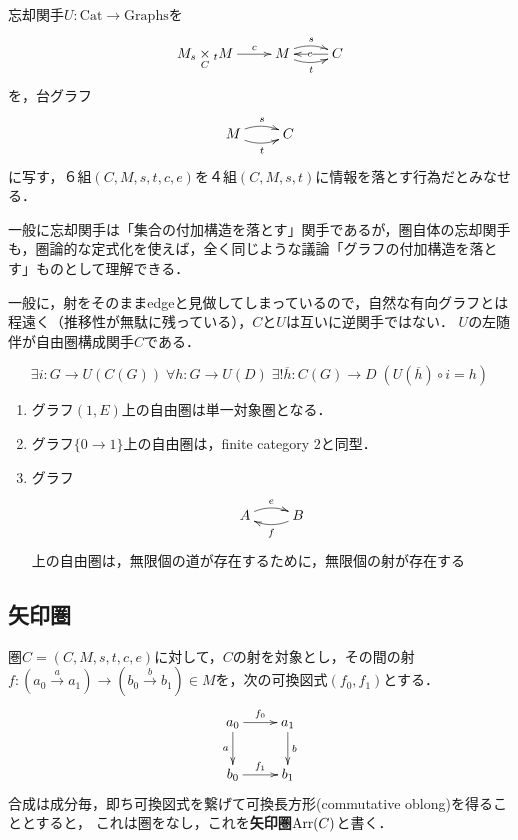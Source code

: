 \documentclass[uplatex, dvipdfmx]{jsreport}
\begin{document}
\begin{definition}
    忘却関手$U:\mathrm{Cat}\to \mathrm{Graphs}$を
    \[\xymatrix{
        {M_s\underset{C}{\times}{}_tM}\ar[r]^-c&M\ar@/^/[r]^-{s}\ar@/_/[r]_-{t}&C\ar[l]|e
    }\]
    を，台グラフ
    \[\xymatrix{
        M\ar@/^/[r]^-{s}\ar@/_/[r]_-{t}&C
    }\]
    に写す，６組$(C,M,s,t,c,e)$を４組$(C,M,s,t)$に情報を落とす行為だとみなせる．
\end{definition}
\begin{remark}
    一般に忘却関手は「集合の付加構造を落とす」関手であるが，圏自体の忘却関手も，圏論的な定式化を使えば，全く同じような議論「グラフの付加構造を落とす」ものとして理解できる．

    一般に，射をそのままedgeと見做してしまっているので，自然な有向グラフとは程遠く（推移性が無駄に残っている），$C$と$U$は互いに逆関手ではない．
    $U$の左随伴が自由圏構成関手$C$である．
\end{remark}

\begin{definition}
    \[ \exists i:G\to U(C(G))\; \forall h:G\to U(D) \; \exists !\overline{h}:C(G)\to D\; (U(\overline{h})\circ i=h) \]
\end{definition}
\begin{example}\mbox{}
    \begin{enumerate}
        \item グラフ$(1, E)$上の自由圏は単一対象圏となる．
        \item グラフ$\{0\to 1\}$上の自由圏は，finite category $2$と同型．
        \item グラフ
            \[\xymatrix{
                A\ar@/^/[r]^-e&B\ar@/^/[l]^-f
            }\]
        上の自由圏は，無限個の道が存在するために，無限個の射が存在する
    \end{enumerate}
\end{example}

\subsection{矢印圏}

\begin{definition}
    圏$C=(C,M,s,t,c,e)$に対して，$C$の射を対象とし，その間の射$f:(a_0\xrightarrow{a} a_1)\to (b_0\xrightarrow{b} b_1) \in M$を，次の可換図式$(f_0,f_1)$とする．
    \[\xymatrix{
        a_0\ar[r]^-{f_0}\ar[d]_-a&a_1\ar[d]^-b\\
        b_0\ar[r]^-{f_1}&b_1
    }\]
    合成は成分毎，即ち可換図式を繋げて可換長方形(commutative oblong)を得ることとすると，
    これは圏をなし，これを\textbf{矢印圏}$\mathrm{Arr}(C)$と書く．
\end{definition}
\end{document}
